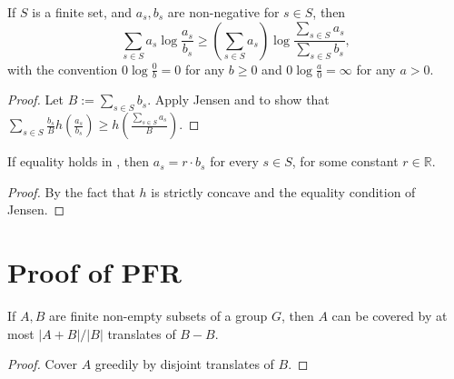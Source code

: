 \begin{lemma}
  \label{log-sum}\leanok
  If $S$ is a finite set, and $a_s,b_s$ are non-negative for $s\in S$, then
  $$\sum_{s\in S} a_s \log\frac{a_s}{b_s}\ge \left(\sum_{s\in S}a_s\right)\log\frac{\sum_{s\in S} a_s}{\sum_{s\in S} b_s},$$
  with the convention $0\log\frac{0}{b}=0$ for any $b\ge 0$ and $0\log\frac{a}{0}=\infty$ for any $a>0$.
\end{lemma}
\begin{proof}\leanok
  Let $B:=\sum_{s\in S} b_s$. Apply Jensen and  to show that $\sum_{s\in S} \frac{b_s}{B} h(\frac{a_s}{b_s})\ge h(\frac{\sum_{s\in S} a_s}{B})$.
\end{proof}

\begin{lemma}
  \label{converse-log-sum}\leanok
If equality holds in , then $a_s=r\cdot b_s$ for every $s\in S$, for some constant $r\in \mathbb{R}$.
\end{lemma}

\begin{proof}\leanok
{} By the fact that $h$ is strictly concave and the equality condition of Jensen.
\end{proof}


















\chapter{Proof of PFR}

\begin{lemma}
\label{ruz-cov}
\leanok
If $A,B$ are finite non-empty subsets of a group $G$, then $A$ can be covered by at most $|A+B|/|B|$ translates of $B-B$.
\end{lemma}
\begin{proof}
\leanok
Cover $A$ greedily by disjoint translates of $B$.
\end{proof}

